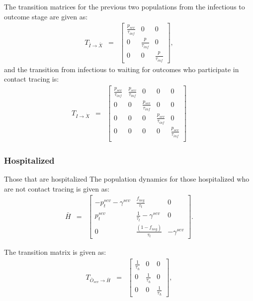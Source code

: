 \documentclass{article}
\begin{document}
The transition matrices for the previous two populations from the infectious to outcome stage are given as:
\begin{eqnarray}
T_{\bar{I} \rightarrow \bar{X}} &=&
\begin{bmatrix}
\frac{p_{sev}}{\tau_{inf}}  & 0                 & 0 \\ 
 0          &  \frac{p_{}}{\tau_{inf}}  & 0 \\ 
 0          & 0                 &  \frac{p_{}}{\tau_{inf}} 
\end{bmatrix},
\end{eqnarray}
and the transition from infectious to waiting for outcomes who participate in contact tracing is:
\begin{eqnarray}
T_{\dot{I} \rightarrow \dot{X}} &=&
\begin{bmatrix}
\frac{p_{sev}}{\tau_{inf}}  &  \frac{p_{sev}}{\tau_{inf}}                 & 0 & 0 & 0 \\ 
 0          & 0                 &  \frac{p_{sev}}{\tau_{inf}} & 0 & 0 \\ 
0           & 0                 &  0 & \frac{p_{sev}}{\tau_{inf}} & 0 \\ 
0           & 0                 &  0 & 0 & \frac{p_{sev}}{\tau_{inf}} \\
\end{bmatrix}
\end{eqnarray}

\subsubsection{Hospitalized}
Those that are hospitalized 
The population dynamics for those hospitalized who are not contact tracing is given as:
\begin{eqnarray}
\bar{H} &=&
\begin{bmatrix}
- p^{sev}_{t} - \gamma^{sev}  &  \frac{f_{neg}}{\tau_{t}}            & 0 \\ 
 p^{sev}_{t}              & \frac{1}{\tau_{t}} - \gamma^{sev}       & 0  \\ 
 0                  & \frac{(1- f_{neg})}{\tau_{t}}                        & -\gamma^{sev}
\end{bmatrix}.
\end{eqnarray}

The transition matrix is given as:
\begin{eqnarray}
T_{\bar{O}_{sev} \rightarrow \bar{H}} &=&
\begin{bmatrix}
\frac{1}{\tau_{h}}  & 0                 & 0 \\ 
 0          &  \frac{1}{\tau_{h}}  & 0 \\ 
 0          & 0                 &  \frac{1}{\tau_{h}} 
\end{bmatrix},
\end{eqnarray}
\end{document}

